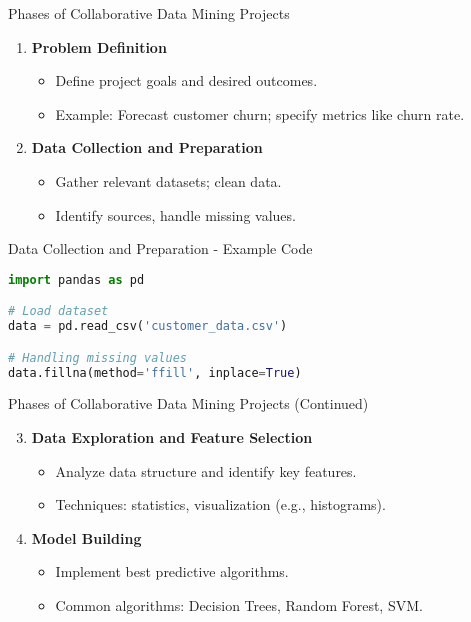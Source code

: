 \documentclass[aspectratio=169]{beamer}
\begin{document}
\begin{frame}{Phases of Collaborative Data Mining Projects}
    \begin{enumerate}
        \item \textbf{Problem Definition}
            \begin{itemize}
                \item Define project goals and desired outcomes.
                \item Example: Forecast customer churn; specify metrics like churn rate.
            \end{itemize}
        
        \item \textbf{Data Collection and Preparation}
            \begin{itemize}
                \item Gather relevant datasets; clean data.
                \item Identify sources, handle missing values.
            \end{itemize}
    \end{enumerate}
\end{frame}

\begin{frame}[fragile]{Data Collection and Preparation - Example Code}
    \begin{lstlisting}[language=Python]
import pandas as pd

# Load dataset
data = pd.read_csv('customer_data.csv')

# Handling missing values
data.fillna(method='ffill', inplace=True)
    \end{lstlisting}
\end{frame}

\begin{frame}{Phases of Collaborative Data Mining Projects (Continued)}
    \begin{enumerate}
        \setcounter{enumi}{2}
        \item \textbf{Data Exploration and Feature Selection}
            \begin{itemize}
                \item Analyze data structure and identify key features.
                \item Techniques: statistics, visualization (e.g., histograms).
            \end{itemize}

        \item \textbf{Model Building}
            \begin{itemize}
                \item Implement best predictive algorithms.
                \item Common algorithms: Decision Trees, Random Forest, SVM.
            \end{itemize}
    \end{enumerate}
\end{frame}
\end{document}
